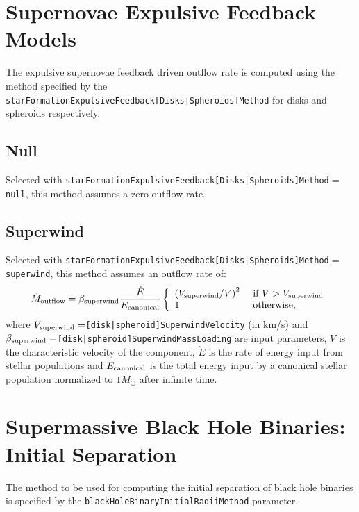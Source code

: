 \section{Supernovae Expulsive Feedback Models}\label{sec:sneExpulsiveFeedback}

The expulsive supernovae feedback driven outflow rate is computed using the method specified by the {\tt starFormationExpulsiveFeedback[Disks|Spheroids]Method} for disks and spheroids respectively.

\subsection{Null}

Selected with {\tt starFormationExpulsiveFeedback[Disks|Spheroids]Method}$=${\tt null}, this method assumes a zero outflow rate.

\subsection{Superwind}

Selected with {\tt starFormationExpulsiveFeedback[Disks|Spheroids]Method}$=${\tt superwind}, this method assumes an outflow rate of:
\begin{equation}
 \dot{M}_{\rm outflow} =  \beta_{\rm superwind} {\dot{E} \over E_{\rm canonical}} \left\{ \begin{array}{ll} \left( V_{\rm superwind}/V\right)^2 & \hbox{ if } V > V_{\rm superwind} \\ 1 & \hbox{ otherwise,} \end{array} \right.
\end{equation}
where $V_{\rm superwind}=${\tt [disk|spheroid]SuperwindVelocity} (in km/s) and $\beta_{\rm superwind}=${\tt [disk|spheroid]SuperwindMassLoading} are input parameters, $V$ is the characteristic velocity of the component, $\dot{E}$ is the rate of energy input from stellar populations and $E_{\rm canonical}$ is the total energy input by a canonical stellar population normalized to $1 M_\odot$ after infinite time.

\section{Supermassive Black Hole Binaries: Initial Separation}\label{sec:blackHoleBinaryInitialRadii}

The method to be used for computing the initial separation of black hole binaries is specified by the {\tt blackHoleBinaryInitialRadiiMethod} parameter.

